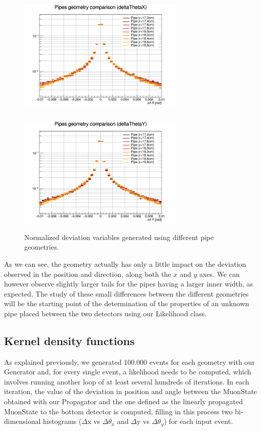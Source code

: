 \documentclass[a4paper, 11pt]{report}
\begin{document}
\begin{figure}[htbp]
{\begin{minipage}[b]{.49\textwidth}
\includegraphics[width=8cm, height=6cm]{figs/deltaThetaX.png}
\end{minipage}\hfill
\begin{minipage}[b]{.49\textwidth}
\includegraphics[width=8cm, height=6cm]{figs/deltaThetaY.png}
\end{minipage} \hfill
}
\caption{Normalized deviation variables generated using different pipe geometries.}
\label{fig:gemComp}
\end{figure}

As we can see, the geometry actually has only a little impact on the deviation observed in the position and direction, along both the $x$ and $y$ axes. We can however observe slightly larger tails for the pipes having a larger inner width, as expected. The study of these small differences between the different geometries will be the starting point of the determination of the properties of an unknown pipe placed between the two detectors using our Likelihood class.

\subsection{Kernel density functions}

As explained previously, we generated 100.000 events for each geometry with our Generator and, for every single event, a likelihood needs to be computed, which involves running another loop of at least several hundreds of iterations. In each iteration, the value of the deviation in position and angle between the MuonState obtained with our Propagator and the one defined as the linearly propagated MuonState to the bottom detector is computed, filling in this process two bi-dimensional histograms ($\Delta$x vs $\Delta \theta_x$ and $\Delta$y vs $\Delta \theta_y$) for each input event.
\end{document}

